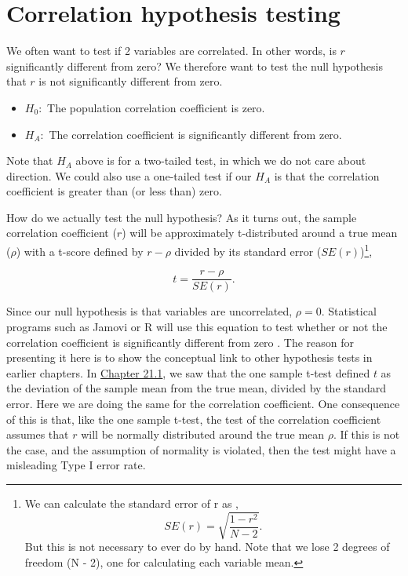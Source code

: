 \documentclass[
]{scrbook}
\providecommand{\tightlist}{%
  \setlength{\itemsep}{0pt}\setlength{\parskip}{0pt}}
\begin{document}
\hypertarget{correlation-hypothesis-testing}{%
\section{Correlation hypothesis testing}\label{correlation-hypothesis-testing}}

We often want to test if 2 variables are correlated.
In other words, is \(r\) significantly different from zero?
We therefore want to test the null hypothesis that \(r\) is not significantly different from zero.

\begin{itemize}
\tightlist
\item
  \(H_{0}:\) The population correlation coefficient is zero.
\item
  \(H_{A}:\) The correlation coefficient is significantly different from zero.
\end{itemize}

Note that \(H_{A}\) above is for a two-tailed test, in which we do not care about direction.
We could also use a one-tailed test if our \(H_{A}\) is that the correlation coefficient is greater than (or less than) zero.

How do we actually test the null hypothesis?
As it turns out, the sample correlation coefficient (\(r\)) will be approximately t-distributed around a true mean (\(\rho\)) with a t-score defined by \(r - \rho\) divided by its standard error (\(SE(r)\))\footnote{We can calculate the standard error of r as \citep{Rahman1968}, \[SE(r) = \sqrt{\frac{1 - r^{2}}{N - 2}}.\] But this is not necessary to ever do by hand. Note that we lose 2 degrees of freedom (N - 2), one for calculating each variable mean.},

\[t = \frac{r - \rho}{SE(r)}.\]

Since our null hypothesis is that variables are uncorrelated, \(\rho = 0\).
Statistical programs such as Jamovi or R will use this equation to test whether or not the correlation coefficient is significantly different from zero \citep{Jamovi2022, Rproject}.
The reason for presenting it here is to show the conceptual link to other hypothesis tests in earlier chapters.
In \protect\hyperlink{one-sample-t-test}{Chapter 21.1}, we saw that the one sample t-test defined \(t\) as the deviation of the sample mean from the true mean, divided by the standard error.
Here we are doing the same for the correlation coefficient.
One consequence of this is that, like the one sample t-test, the test of the correlation coefficient assumes that \(r\) will be normally distributed around the true mean \(\rho\).
If this is not the case, and the assumption of normality is violated, then the test might have a misleading Type I error rate.
\end{document}

